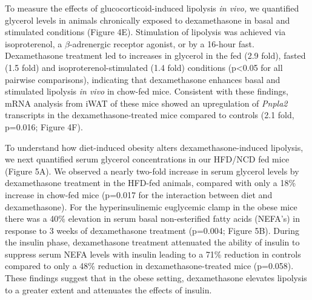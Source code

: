 \documentclass[11pt]{article} %
\begin{document}
To measure the effects of glucocorticoid-induced lipolysis \emph{in
vivo,} we quantified glycerol levels in animals chronically exposed to
dexamethasone in basal and stimulated conditions (Figure 4E).
Stimulation of lipolysis was achieved via isoproterenol, a $\beta$-adrenergic
receptor agonist, or by a 16-hour fast. Dexamethasone treatment led to
increases in glycerol in the fed (2.9 fold), fasted (1.5 fold) and
isoproterenol-stimulated (1.4 fold) conditions (p\textless{}0.05 for all
pairwise comparisons), indicating that dexamethasone enhances basal and
stimulated lipolysis \emph{in vivo} in chow-fed mice. Consistent with
these findings, mRNA analysis from iWAT of these mice showed an
upregulation of \emph{Pnpla2} transcripts in the dexamethasone-treated
mice compared to controls (2.1 fold, p=0.016; Figure 4F).

To understand how diet-induced obesity alters dexamethasone-induced
lipolysis, we next quantified serum glycerol concentrations in our
HFD/NCD fed mice (Figure 5A). We observed a nearly two-fold increase in
serum glycerol levels by dexamethasone treatment in the HFD-fed animals,
compared with only a 18\% increase in chow-fed mice (p=0.017 for the
interaction between diet and dexamethasone). For the hyperinsulinemic
euglycemic clamp in the obese mice there was a 40\% elevation in serum
basal non-esterified fatty acids (NEFA's) in response to 3 weeks of
dexamethasone treatment (p=0.004; Figure 5B). During the insulin phase,
dexamethasone treatment attenuated the ability of insulin to suppress
serum NEFA levels with insulin leading to a 71\% reduction in controls
compared to only a 48\% reduction in dexamethasone-treated mice
(p=0.058). These findings suggest that in the obese setting,
dexamethasone elevates lipolysis to a greater extent and attenuates the
effects of insulin.
\end{document}
